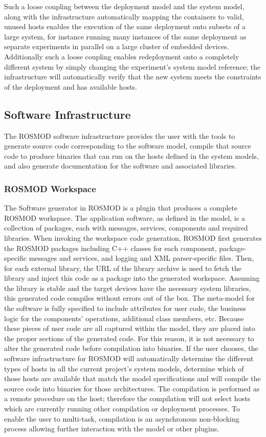 Such a loose coupling between the deployment model and the system
model, along with the infrastructure automatically mapping the
containers to valid, unused hosts enables the execution of the same
deployment onto subsets of a large system, for instance running many
instances of the same deployment as separate experiments in parallel
on a large cluster of embedded devices.  Additionally such a loose
coupling enables redeployment onto a completely different system by
simply changing the experiment's system model reference; the
infrastructure will automatically verify that the new system meets the
constraints of the deployment and has available hosts.

\subsection{Software Infrastructure} 

The ROSMOD software infrastructure provides the user with the tools to
generate source code corresponding to the software model, compile that
source code to produce binaries that can run on the hosts defined in
the system models, and also generate documentation for the software
and associated libraries.

\subsubsection{ROSMOD Workspace}
\label{sec:code_generation}

The Software generator in ROSMOD is a plugin that produces a complete
ROSMOD workspace. The application software, as defined in the model,
is a collection of packages, each with messages, services, components
and required libraries. When invoking the workspace code generation,
ROSMOD first generates the ROSMOD packages including C++ classes for
each component, package-specific messages and services, and logging
and XML parser-specific files. Then, for each external library, the
URL of the library archive is used to fetch the library and inject
this code as a package into the generated workspace. Assuming the
library is stable and the target devices have the necessary system
libraries, this generated code compiles without errors out of the
box. The meta-model for the software is fully specified to include
attributes for user code, the business logic for the components'
operations, additional class members, etc. Because these pieces of
user code are all captured within the model, they are placed into the
proper sections of the generated code.  For this reason, it is not
necessary to alter the generated code before compilation into
binaries.  If the user chooses, the software infrastructure for ROSMOD
will automatically determine the different types of hosts in all the
current project's system models, determine which of those hosts are
available that match the model specifications and will compile the
source code into binaries for those architectures.  The compilation is
performed as a remote procedure on the host; therefore the compilation
will not select hosts which are currently running other compilation or
deployment processes.  To enable the user to multi-task, compilation
is an asynchronous non-blocking process allowing further interaction
with the model or other plugins.

